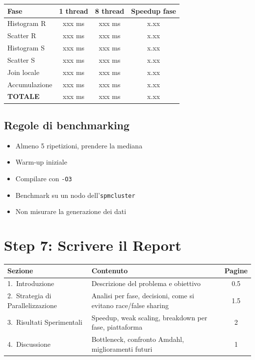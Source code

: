 \documentclass[11pt,a4paper]{article}
\begin{document}
\begin{center}\small
\begin{tabular}{l|ccc}
\toprule
\textbf{Fase} & \textbf{1 thread} & \textbf{8 thread} & \textbf{Speedup fase}\\\midrule
Histogram R & xxx ms & xxx ms & x.xx\\
Scatter R & xxx ms & xxx ms & x.xx\\
Histogram S & xxx ms & xxx ms & x.xx\\
Scatter S & xxx ms & xxx ms & x.xx\\
Join locale & xxx ms & xxx ms & x.xx\\
Accumulazione & xxx ms & xxx ms & x.xx\\\midrule
\textbf{TOTALE} & xxx ms & xxx ms & x.xx\\
\bottomrule
\end{tabular}
\end{center}

\subsection{Regole di benchmarking}
\begin{itemize}[nosep]
  \item Almeno 5 ripetizioni, prendere la mediana
  \item Warm-up iniziale
  \item Compilare con \texttt{-O3}
  \item Benchmark su un nodo dell'\texttt{spmcluster}
  \item Non misurare la generazione dei dati
\end{itemize}


\section{Step 7: Scrivere il Report}

\begin{center}\small
\begin{tabular}{llc}
\toprule
\textbf{Sezione} & \textbf{Contenuto} & \textbf{Pagine}\\\midrule
1.\ Introduzione & Descrizione del problema e obiettivo & 0.5\\
2.\ Strategia di Parallelizzazione & Analisi per fase, decisioni, come si evitano race/false sharing & 1.5\\
3.\ Risultati Sperimentali & Speedup, weak scaling, breakdown per fase, piattaforma & 2\\
4.\ Discussione & Bottleneck, confronto Amdahl, miglioramenti futuri & 1\\
\bottomrule
\end{tabular}
\end{center}
\end{document}
